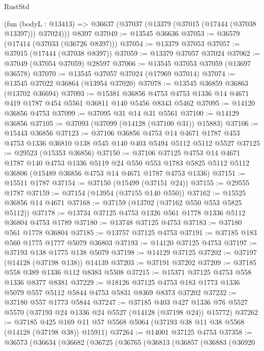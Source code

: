 \begin{lexlean}{RustStd}
\begin{coremodule}
    (fun (bodyL : @13413) => @36637 (@37037 (@13379 (@37015 (@17444 (@37038 @13397))) @37024)))
    @8397
@37049 := @13545 @36636
@37053 := @36579 (@17414 (@37033 (@36726 @8397)))
@37054 := @13379 @37053
@37057 := @37015 (@17444 (@37038 @8397))
@37059 := @13379 @37057 @37024
@37062 := @37049 (@37054 @37059) @28597
@37066 := @13545 @37053 @37059 (@13697 @36578)
@37070 := @13545 @37057 @37024 (@17969 @37014)
@37074 := @13545 @37022 @36864 (@13954 @37020)
@37078 := @13545 @36859 @36863 (@13702 @36694)
@37093 := @15381
    @36856
    @4753
    @4753
    @1336
    @14
    @4671
    @419
    @1787
    @454
    @5561
    @36811
    @140
    @5456
    @8343
    @5462
@37095 := @14120 @36856 @4753
@37099 := @37095 @31 @14 @31 @5561
@37100 := @14129 @36856
@37105 := @37093 (@37099 (@14128 (@37100 @31)) @15883)
@37106 := @15443 @36856
@37123 := @37106
    @36856
    @4753
    @14
    @4671
    @1787
    @453
    @4753
    @1336
    @36810
    @138
    @545
    @140
    @403
    @5494
    @5112
    @5112
    @5527
@37125 := @29523 (@15353 @36856)
@37150 := @37106
    @37125
    @4753
    @14
    @4671
    @1787
    @140
    @4753
    @1336
    @5119
    @24
    @550
    @553
    @1783
    @5825
    @5112
    @5112
    @36806
    (@15489 @36856 @4753 @14 @4671 @1787 @4753 @1336)
@37151 := @15511 @1787
@37154 := @37150 (@15499 (@37151 @24))
@37155 := @29555 @1787
@37159 := @37154 (@13954 (@37155 @140 @550))
@37162 := @15525 @36856 @14 @4671
@37168 := @37159 (@13702 (@37162 @550 @553 @5825 @5112))
@37178 := @13734 @37125 @4753 @1326 @561 @1778 @1336 @5112 @36804 @4753 @1789
@37180 := @13748 @37125 @4753
@37183 := @37180 @561 @1778 @36804
@37185 := @13757 @37125 @4753
@37191 := @37185 @183 @560 @1775 @1777 @5079 @36803
@37193 := @14120 @37125 @4753
@37197 := @37193 @138 @1775 @138 @5079
@37198 := @14129 @37125
@37202 := @37197 (@14128 (@37198 @138)) @14139
@37203 := @37191 @37202
@37209 := @37185 @558 @389 @1336 @112 @8383 @5508
@37215 := @15371 @37125 @4753 @558 @1336 @8377 @8381
@37229 := @18126 @37125 @4753 @183 @1773 @1336 @5079 @557 @5112 @5844 @4753 @5831 @8369 @8373 @37202
@37232 := @37180 @557 @1773 @5844
@37247 := @37185
    @403
    @427
    @1336
    @76
    @5527
    @5570
    (@37193 @24 @1336 @24 @5527 (@14128 (@37198 @24)) @15772)
@37262 := @37185
    @425
    @169
    @11
    @57
    @5568
    @5064
    (@37193 @38 @11 @38 @5568 (@14128 (@37198 @38)) @15911)
@37264 := @14001 @37125 @4753
@37358 := @36573
    (@36634
      (@36682
        (@36725
          (@36765
            (@36813
              (@36857
                (@36883
                  (@36920

\end{coremodule}
\end{lexlean}

